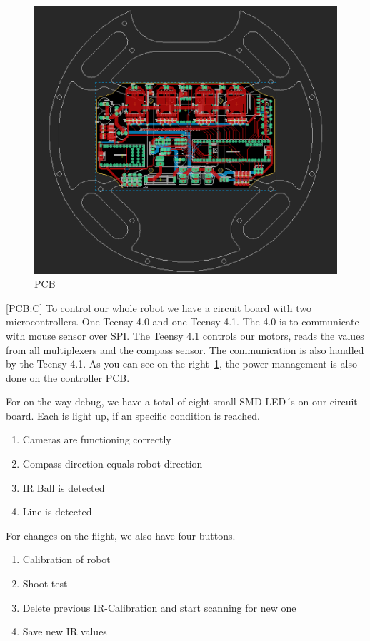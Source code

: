 \begin{figure}
    \centering
    \includegraphics[width=0.75\linewidth]{img/eagle/ControllerPCB.png}
    \caption{PCB}
    \label{fig:CPCB}
\end{figure}

\ref{PCB:C} To control our whole robot we have a circuit board with two microcontrollers. One Teensy 4.0 and one Teensy 4.1. The 4.0 is to communicate with
mouse sensor over SPI. The Teensy 4.1 controls our motors, reads the values from all multiplexers and the compass sensor. The communication is also 
handled by the Teensy 4.1. 
\newline
As you can see on the right~\ref{fig:CPCB}, the power management is also done on the controller PCB.
\newline

For on the way debug, we have a total of eight small SMD-LED´s on our circuit board.
Each is light up, if an specific condition is reached.
\begin{enumerate}
    \item{Cameras are functioning correctly}
    \item{Compass direction equals robot direction}
    \item{IR Ball is detected}
    \item{Line is detected}
\end{enumerate}

\hfill \break
For changes on the flight, we also have four buttons. 
\begin{enumerate}
    \item{Calibration of robot}
    \item{Shoot test}
    \item{Delete previous IR-Calibration and start scanning for new one}
    \item{Save new IR values}
\end{enumerate}
\hfill \break

